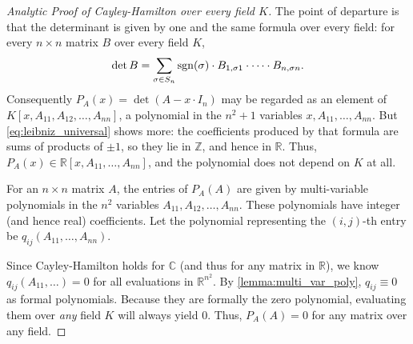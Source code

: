 \begin{proof}[Analytic Proof of Cayley-Hamilton over every field $K$]
  The point of departure is that the determinant is given by one and the same formula over every field: for every $n \times n$ matrix $B$ over every field $K$,
  \begin{equation} \label{eq:leibniz_universal}
    \det B = \sum_{\sigma \in S_n} \operatorname{sgn}(\sigma) \cdot B_{1, \sigma 1} \cdot \dots \cdot B_{n, \sigma n}.
  \end{equation}
  Consequently $P_A(x) = \det(A - x \cdot I_n)$ may be regarded as an element of $K[x, A_{11}, A_{12}, \dots, A_{nn}]$, a polynomial in the $n^2 + 1$ variables $x, A_{11}, \dots, A_{nn}$. But \eqref{eq:leibniz_universal} shows more: the coefficients produced by that formula are sums of products of $\pm 1$, so they lie in $\mathbb{Z}$, and hence in $\mathbb{R}$. Thus, $P_A(x) \in \mathbb{R}[x, A_{11}, \dots, A_{nn}]$, and the polynomial does not depend on $K$ at all.

  For an $n \times n$ matrix $A$, the entries of $P_A(A)$ are given by multi-variable polynomials in the $n^2$ variables $A_{11}, A_{12}, \dots, A_{nn}$. These polynomials have integer (and hence real) coefficients. Let the polynomial representing the $(i,j)$-th entry be $q_{ij}(A_{11}, \dots, A_{nn})$.

  Since Cayley-Hamilton holds for $\mathbb{C}$ (and thus for any matrix in $\mathbb{R}$), we know $q_{ij}(A_{11}, \dots) = 0$ for all evaluations in $\mathbb{R}^{n^2}$. By \cref{lemma:multi_var_poly}, $q_{ij} \equiv 0$ as formal polynomials. Because they are formally the zero polynomial, evaluating them over \textit{any} field $K$ will always yield 0. Thus, $P_A(A) = 0$ for any matrix over any field.
\end{proof}

